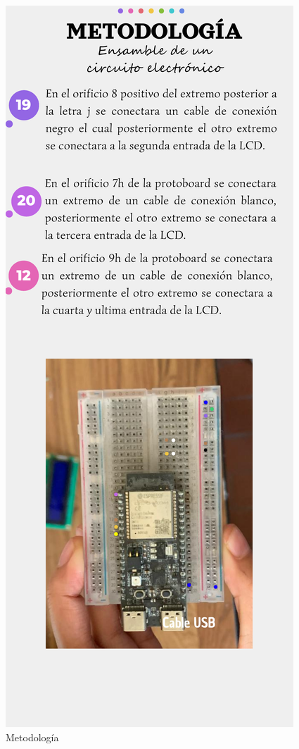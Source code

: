     \begin{figure}[H]
        \centering
        \includegraphics[trim = {5mm 10mm 5mm 50mm},clip,scale=0.4]{16/Img/instructivoCE(3).pdf}
        \caption{Metodología}
        \label{fig:metodología}
    \end{figure}

